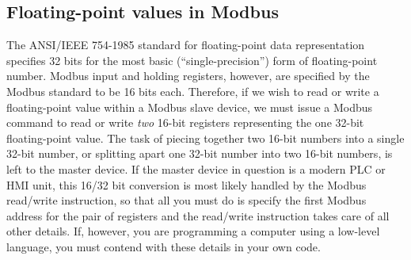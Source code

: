 













\filbreak
\subsection{Floating-point values in Modbus}

The ANSI/IEEE 754-1985 standard for floating-point data representation specifies 32 bits for the most basic (``single-precision'') form of floating-point number.  Modbus input and holding registers, however, are specified by the Modbus standard to be 16 bits each.  Therefore, if we wish to read or write a floating-point value within a Modbus slave device, we must issue a Modbus command to read or write \textit{two} 16-bit registers representing the one 32-bit floating-point value.  The task of piecing together two 16-bit numbers into a single 32-bit number, or splitting apart one 32-bit number into two 16-bit numbers, is left to the master device.  If the master device in question is a modern PLC or HMI unit, this 16/32 bit conversion is most likely handled by the Modbus read/write instruction, so that all you must do is specify the first Modbus address for the pair of registers and the read/write instruction takes care of all other details.  If, however, you are programming a computer using a low-level language, you must contend with these details in your own code.    

